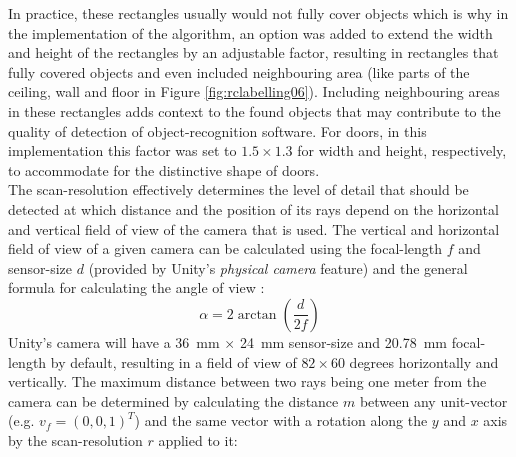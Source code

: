 In practice, these rectangles usually would not fully cover objects which is why in the implementation of the algorithm, an option was added to extend the width and height of the rectangles by an adjustable factor, resulting in rectangles that fully covered objects and even included neighbouring area (like parts of the ceiling, wall and floor in Figure \ref{fig:rclabelling06}). Including neighbouring areas in these rectangles adds context to the found objects that may contribute to the quality of detection of object-recognition software. For doors, in this implementation this factor was set to $1.5 \times 1.3$ for width and height, respectively, to accommodate for the distinctive shape of doors.\\
The scan-resolution effectively determines the level of detail that should be detected at which distance and the position of its rays depend on the horizontal and vertical field of view of the camera that is used. The vertical and horizontal field of view of a given camera can be calculated using the focal-length $f$ and sensor-size $d$ (provided by Unity's \emph{physical camera} feature) and the general formula for calculating the angle of view \cite{WikipediaAngleOfView}:
\begin{equation}\alpha = 2 \arctan(\frac{d}{2f})\end{equation}
Unity's camera will have a \SI{36}mm $\times$ \SI{24}{mm} sensor-size and \SI{20.78}{mm} focal-length by default, resulting in a field of view of $82 \times 60$ degrees horizontally and vertically. The maximum distance between two rays being one meter from the camera can be determined by calculating the distance $m$ between any unit-vector (e.g. $v_f = (0, 0, 1)^T$) and the same vector with a rotation along the $y$ and $x$ axis by the scan-resolution $r$ applied to it:\\
